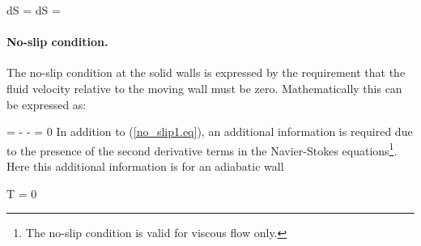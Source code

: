 %
\beq
 \oint{}d{\cal S} =
 \oint{}d{\cal S} =
  \label{flow_tangency2.eq}
\eeq
%
\paragraph{No-slip condition.}
%
%
 The no-slip condition at the solid walls is expressed by the requirement that the
 fluid velocity relative to the moving wall must be zero.
 Mathematically this can be expressed as:

%
\beq
   =  - \vec{\Omega}\times{} -  = 0
  \label{no_slip1.eq}
\eeq
%
 In addition to (\ref{no_slip1.eq}), an additional information is required
 due to the presence of the second derivative terms in the Navier-Stokes
 equations\footnote{The no-slip condition is valid for viscous flow only.}.
 Here this additional information is for an adiabatic wall

%
\beq
  \cdot\nabl T = 0
  \label{no_slip2.eq}
\eeq
%
%
